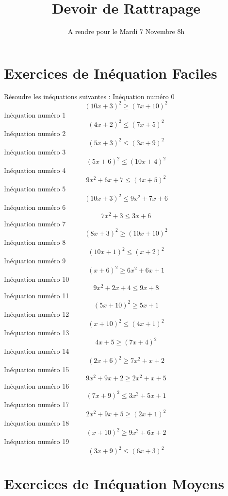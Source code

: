 \documentclass{article}
\title{Devoir de Rattrapage}
\date{A rendre pour le Mardi 7 Novembre 8h}\usepackage{natbib}
\begin{document}
\maketitle
 \section{Exercices de In\'equation Faciles}

 R\'esoudre les in\'equations suivantes : 
In\'equation num\'ero 0 \[\left(10 x + 3\right)^{2} \geq \left(7 x + 10\right)^{2}\]In\'equation num\'ero 1 \[\left(4 x + 2\right)^{2} \leq \left(7 x + 5\right)^{2}\]In\'equation num\'ero 2 \[\left(5 x + 3\right)^{2} \leq \left(3 x + 9\right)^{2}\]In\'equation num\'ero 3 \[\left(5 x + 6\right)^{2} \leq \left(10 x + 4\right)^{2}\]In\'equation num\'ero 4 \[9 x^{2} + 6 x + 7 \leq \left(4 x + 5\right)^{2}\]In\'equation num\'ero 5 \[\left(10 x + 3\right)^{2} \leq 9 x^{2} + 7 x + 6\]In\'equation num\'ero 6 \[7 x^{2} + 3 \leq 3 x + 6\]In\'equation num\'ero 7 \[\left(8 x + 3\right)^{2} \geq \left(10 x + 10\right)^{2}\]In\'equation num\'ero 8 \[\left(10 x + 1\right)^{2} \leq \left(x + 2\right)^{2}\]In\'equation num\'ero 9 \[\left(x + 6\right)^{2} \geq 6 x^{2} + 6 x + 1\]In\'equation num\'ero 10 \[9 x^{2} + 2 x + 4 \leq 9 x + 8\]In\'equation num\'ero 11 \[\left(5 x + 10\right)^{2} \geq 5 x + 1\]In\'equation num\'ero 12 \[\left(x + 10\right)^{2} \leq \left(4 x + 1\right)^{2}\]In\'equation num\'ero 13 \[4 x + 5 \geq \left(7 x + 4\right)^{2}\]In\'equation num\'ero 14 \[\left(2 x + 6\right)^{2} \geq 7 x^{2} + x + 2\]In\'equation num\'ero 15 \[9 x^{2} + 9 x + 2 \geq 2 x^{2} + x + 5\]In\'equation num\'ero 16 \[\left(7 x + 9\right)^{2} \leq 3 x^{2} + 5 x + 1\]In\'equation num\'ero 17 \[2 x^{2} + 9 x + 5 \geq \left(2 x + 1\right)^{2}\]In\'equation num\'ero 18 \[\left(x + 10\right)^{2} \geq 9 x^{2} + 6 x + 2\]In\'equation num\'ero 19 \[\left(3 x + 9\right)^{2} \leq \left(6 x + 3\right)^{2}\]
 \section{Exercices de In\'equation Moyens}
\end{document}
